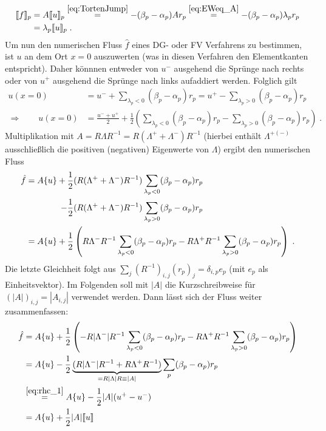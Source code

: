 \begin{equation}
  \begin{aligned}
    \llbracket f \rrbracket_p &= A\llbracket u \rrbracket_p \stackrel{\eqref{eq:TortenJump}}{=} -(\beta_p - \alpha_p) A r_p \stackrel{\eqref{eq:EWeq_A}}{=}  -(\beta_p - \alpha_p) \lambda_p r_p \\
    &= \lambda_p \llbracket u \rrbracket_p \; .
  \end{aligned}
\end{equation}
Um nun den numerischen Fluss $\hat{f}$ eines DG- oder FV Verfahrens zu bestimmen, ist $u$ an dem Ort $x=0$ auszuwerten (was in diesen Verfahren den Elementkanten entspricht). Daher könnnen entweder von $u^-$ ausgehend die Sprünge nach rechts oder von $u^+$ ausgehend die Sprünge nach links aufaddiert  werden. Folglich gilt
\begin{align}
  \label{eq:rhc_1}
  u(x=0) &= u^- + \sum_{\lambda_p < 0} (\beta_p - \alpha_p)r_p = u^+ - \sum_{\lambda_p > 0} (\beta_p - \alpha_p)r_p \\
  \Rightarrow \qquad u(x=0) &= \frac{u^- + u^+}{2} + \frac{1}{2}\left( \sum_{\lambda_p < 0} (\beta_p - \alpha_p)r_p - \sum_{\lambda_p > 0} (\beta_p - \alpha_p)r_p \right) \; .
\end{align}
Multiplikation mit $A=R\Lambda R^{-1} = R(\Lambda^+ + \Lambda^-)R^{-1}$ (hierbei enthält $\Lambda^{+(-)}$ ausschließlich die positiven (negativen) Eigenwerte von $\Lambda$) ergibt den numerischen Fluss
\begin{align*}
  \hat{f} = A \{ u \} + \frac{1}{2}& (R(\Lambda^+ + \Lambda^-)R^{-1}) \sum_{\lambda_p < 0} (\beta_p - \alpha_p)r_p \\
                     - \frac{1}{2}& (R(\Lambda^+ + \Lambda^-)R^{-1}) \sum_{\lambda_p > 0} (\beta_p - \alpha_p)r_p \\
         = A \{ u \} + \frac{1}{2}&\left( R\Lambda^-R^{-1} \sum_{\lambda_p < 0} (\beta_p - \alpha_p)r_p
                    - R\Lambda^+R^{-1} \sum_{\lambda_p > 0} (\beta_p - \alpha_p)r_p        \right) \; .
\end{align*}
Die letzte Gleichheit folgt aus $\sum_j (R^{-1})_{i,j} (r_p)_j = \delta_{i,p} e_p$ (mit $e_p$ als Einheitsvektor). Im Folgenden soll mit $|A|$ die Kurzschreibweise für $(|A|)_{i,j} = |A_{i,j}|$ verwendet werden. Dann lässt sich der Fluss weiter zusammenfassen:
\begin{align}
  \hat{f} &= A \{ u \} + \frac{1}{2} \left( -R|\Lambda^-|R^{-1} \sum_{\lambda_p < 0} (\beta_p - \alpha_p)r_p
              - R\Lambda^+R^{-1} \sum_{\lambda_p > 0} (\beta_p - \alpha_p)r_p        \right) \\
        &= A \{ u \} - \frac{1}{2} \underbrace{(R|\Lambda^-|R^{-1} + R\Lambda^+R^{-1})}_{=R|\Lambda|R \equiv |A|}  \sum_p(\beta_p - \alpha_p)r_p   \\
        &\stackrel{\eqref{eq:rhc_1}}{=} A \{ u \} - \frac{1}{2} |A| (u^+-u^-) \\
        &= A \{ u \} + \frac{1}{2} |A| \llbracket u \rrbracket
\end{align}
